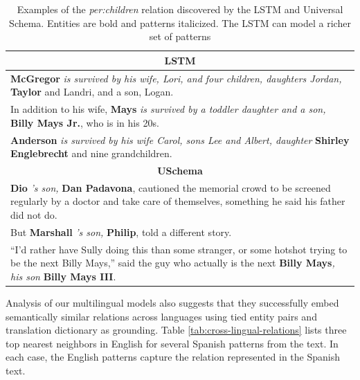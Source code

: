 \begin{table}[h]
\begin{center}
\caption{Examples of the \emph{per:children} relation discovered by the LSTM and Universal Schema. Entities are bold and patterns italicized. The LSTM can model a richer set of patterns \label{tab:lstm-us-similar-rels}}
\small
\begin{tabular}{|p{8cm}|}
\hline
\multicolumn{1}{|c|}{\textbf{LSTM}} \\ \hline
{\bf McGregor} \emph{is survived by his wife, Lori, and four children, daughters Jordan,} { \bf Taylor} and Landri, and a son, Logan. \\ \hline
In addition to his wife, {\bf Mays} \emph{is survived by a toddler daughter and a son,} {\bf Billy Mays Jr.}, who is in his 20s. \\ \hline
{\bf Anderson} \emph{is survived by his wife Carol, sons Lee and Albert, daughter} {\bf Shirley Englebrecht} and nine grandchildren. \\
\hline\hline
\multicolumn{1}{|c|}{\textbf{USchema}}  \\ \hline
{\bf Dio} \emph{'s son,} {\bf Dan Padavona}, cautioned the memorial crowd to be screened regularly by a doctor and take care of themselves, something he said his father did not do. \\ \hline
But {\bf Marshall} \emph{'s son,} {\bf Philip}, told a different story.  \\ \hline
``I'd rather have Sully doing this than some stranger, or some hotshot trying to
be the next Billy Mays,'' said the guy who actually is the next {\bf Billy Mays}\emph{, his son} {\bf Billy Mays III}. \\ 
\hline
\end{tabular}
\end{center}
\end{table}

Analysis of our multilingual models also suggests that they successfully embed semantically similar relations across languages using tied entity pairs and translation dictionary as grounding. Table \ref{tab:cross-lingual-relations} lists three top nearest neighbors in English for several Spanish patterns from the text. In each case, the English patterns capture the relation represented in the Spanish text. 

